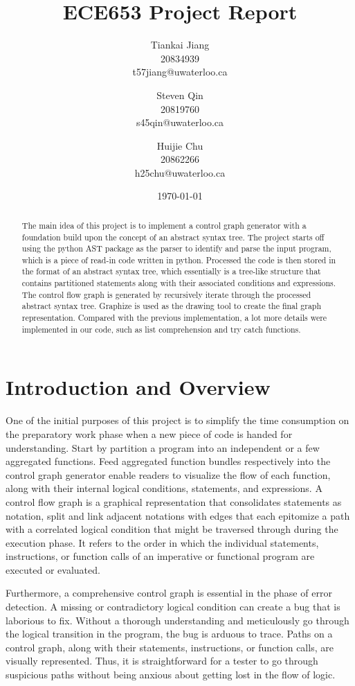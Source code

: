 \documentclass[11pt]{article}
\title{ECE653 Project Report}
\author{Tiankai Jiang\\20834939\\t57jiang@uwaterloo.ca \and Steven Qin\\20819760\\s45qin@uwaterloo.ca \and Huijie Chu\\20862266\\h25chu@uwaterloo.ca}
\date{\today}
\begin{document}
\maketitle

\begin{abstract}
The main idea of this project is to implement a control graph generator with a foundation build upon the concept of an abstract syntax tree. The project starts off using the python AST package as the parser to identify and parse the input program, which is a piece of read-in code written in python. Processed the code is then stored in the format of an abstract syntax tree, which essentially is a tree-like structure that contains partitioned statements along with their associated conditions and expressions. The control flow graph is generated by recursively iterate through the processed abstract syntax tree. Graphize is used as the drawing tool to create the final graph representation. Compared with the previous implementation, a lot more details were implemented in our code, such as list comprehension and try catch functions.
\end{abstract}

\section{Introduction and Overview}\label{section-introduction}
One of the initial purposes of this project is to simplify the time consumption on the preparatory work phase when a new piece of code is handed for understanding. Start by partition a program into an independent or a few aggregated functions. Feed aggregated function bundles respectively into the control graph generator enable readers to visualize the flow of each function, along with their internal logical conditions, statements, and expressions. A control flow graph is a graphical representation that consolidates statements as notation, split and link adjacent notations with edges that each epitomize a path with a correlated logical condition that might be traversed through during the execution phase. It refers to the order in which the individual statements, instructions, or function calls of an imperative or functional program are executed or evaluated.

Furthermore, a comprehensive control graph is essential in the phase of error detection. A missing or contradictory logical condition can create a bug that is laborious to fix. Without a thorough understanding and meticulously go through the logical transition in the program, the bug is arduous to trace. Paths on a control graph, along with their statements, instructions, or function calls, are visually represented. Thus, it is straightforward for a tester to go through suspicious paths without being anxious about getting lost in the flow of logic.
\end{document}
